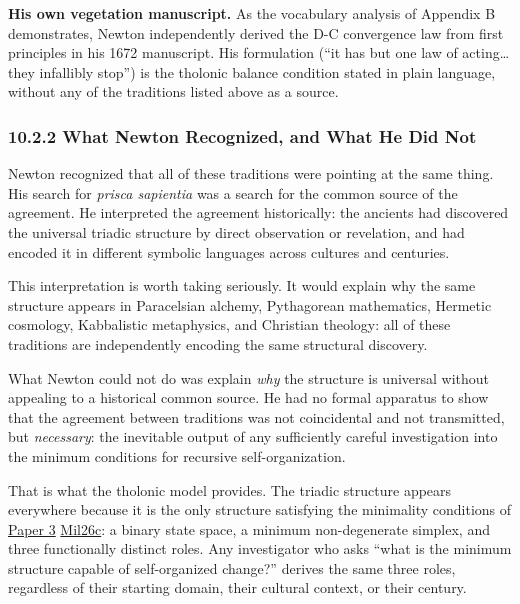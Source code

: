 \documentclass[12pt]{article}
\begin{document}
\textbf{His own vegetation manuscript.} As the vocabulary analysis of
Appendix B demonstrates, Newton independently derived the D-C
convergence law from first principles in his 1672 manuscript. His
formulation (``it has but one law of acting\ldots{} they infallibly
stop'') is the tholonic balance condition stated in plain language,
without any of the traditions listed above as a source.

\subsubsection{10.2.2 What Newton Recognized, and What He Did
Not}\label{what-newton-recognized-and-what-he-did-not}

Newton recognized that all of these traditions were pointing at the same
thing. His search for \emph{prisca sapientia} was a search for the
common source of the agreement. He interpreted the agreement
historically: the ancients had discovered the universal triadic
structure by direct observation or revelation, and had encoded it in
different symbolic languages across cultures and centuries.

This interpretation is worth taking seriously. It would explain why the
same structure appears in Paracelsian alchemy, Pythagorean mathematics,
Hermetic cosmology, Kabbalistic metaphysics, and Christian theology: all
of these traditions are independently encoding the same structural
discovery.

What Newton could not do was explain \emph{why} the structure is
universal without appealing to a historical common source. He had no
formal apparatus to show that the agreement between traditions was not
coincidental and not transmitted, but \emph{necessary}: the inevitable
output of any sufficiently careful investigation into the minimum
conditions for recursive self-organization.

That is what the tholonic model provides. The triadic structure appears
everywhere because it is the only structure satisfying the minimality
conditions of
\href{https://github.com/baardev/truevalue/blob/main/docnav/Research/papers/3_minimal-recursive-triadic-framework/3_minimal-recursive-triadic-framework.pdf}{Paper
3}
\href{https://github.com/baardev/truevalue/blob/main/docnav/Research/papers/3_minimal-recursive-triadic-framework/3_minimal-recursive-triadic-framework.pdf}{Mil26c}:
a binary state space, a minimum non-degenerate simplex, and three
functionally distinct roles. Any investigator who asks ``what is the
minimum structure capable of self-organized change?'' derives the same
three roles, regardless of their starting domain, their cultural
context, or their century.
\end{document}
